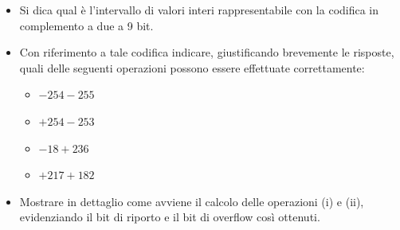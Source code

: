 \begin{Exercise}[label={ex:complemento}]
		\begin{itemize}
				\item[(a)] Si dica qual \`e l'intervallo di valori interi rappresentabile con la codifica in complemento a due a 9 bit.
				\item[(b)] Con riferimento a tale codifica indicare, giustificando brevemente le risposte, quali delle seguenti operazioni possono essere effettuate correttamente:
				\begin{itemize}
						\item $-254 - 255$
						\item $+254 - 253$
						\item $-18 + 236$
						\item $+217 + 182$
				\end{itemize}
				\item[(c)] Mostrare in dettaglio come avviene il calcolo delle operazioni (i) e (ii), evidenziando il bit di riporto e il bit di overflow cos\`i ottenuti.
		\end{itemize}

\end{Exercise}

